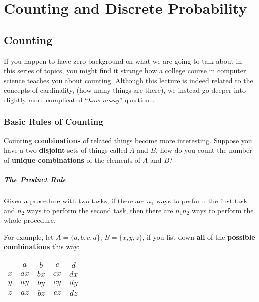 \hypertarget{counting-and-discrete-probability}{%
\section{Counting and Discrete
Probability}\label{counting-and-discrete-probability}}

\hypertarget{counting}{%
\subsection{Counting}\label{counting}}

If you happen to have zero background on what we are going to talk about
in this series of topics, you might find it strange how a college course
in computer science teaches you about counting. Although this lecture is
indeed related to the concepts of cardinality, (how many things are
there), we instead go deeper into slightly more complicated ``\emph{how
many}'' questions.

\hypertarget{basic-rules-of-counting}{%
\subsubsection{Basic Rules of Counting}\label{basic-rules-of-counting}}

Counting \textbf{combinations} of related things become more
interesting. Suppose you have a two \textbf{disjoint} sets of things
called \textbf{\(A\)} and \textbf{\(B\)}, how do you count the number of
\textbf{unique combinations} of the elements of \textbf{\(A\)} and
\textbf{\(B\)}?

\hypertarget{the-product-rule}{%
\subparagraph{The Product Rule}\label{the-product-rule}}

Given a procedure with two tasks, if there are \textbf{\(n_1\)} ways to
perform the first task and \textbf{\(n_2\)} ways to perform the second
task, then there are \textbf{\(n_1 n_2\)} ways to perform the whole
procedure.

For example, let \textbf{\(A=\{a,b,c,d\}\)}, \textbf{\(B=\{x,y,z\}\)},
if you list down \textbf{all} of the \textbf{possible combinations} this
way:

\begin{longtable}[]{@{}ccccc@{}}
\toprule
& \textbf{\(a\)} & \textbf{\(b\)} & \textbf{\(c\)} & \textbf{\(d\)} \\
\midrule
\endhead
\textbf{\(x\)} & \textbf{\(ax\)} & \textbf{\(bx\)} & \textbf{\(cx\)} &
\textbf{\(dx\)} \\
\textbf{\(y\)} & \textbf{\(ay\)} & \textbf{\(by\)} & \textbf{\(cy\)} &
\textbf{\(dy\)} \\
\textbf{\(z\)} & \textbf{\(az\)} & \textbf{\(bz\)} & \textbf{\(cz\)} &
\textbf{\(dz\)} \\
\bottomrule
\end{longtable}

